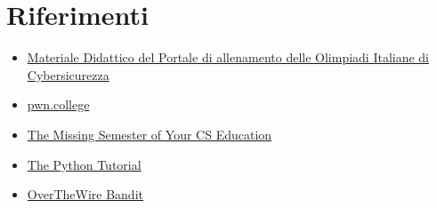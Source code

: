 \documentclass{beamer}
\begin{document}
\section{Riferimenti}
\begin{frame}{\insertsection}
\begin{itemize}
\item \href{https://training.olicyber.it/training}{Materiale Didattico del Portale di allenamento delle Olimpiadi Italiane di Cybersicurezza} 
\item \href{https://pwn.college/}{pwn.college}
\item \href{https://missing.csail.mit.edu/}{The Missing Semester of Your CS Education}
\item \href{https://docs.python.org/3/tutorial/index.html}{The Python Tutorial}
\item \href{https://overthewire.org/wargames/bandit/}{OverTheWire Bandit}
\end{itemize}
\end{frame}
\end{document}
